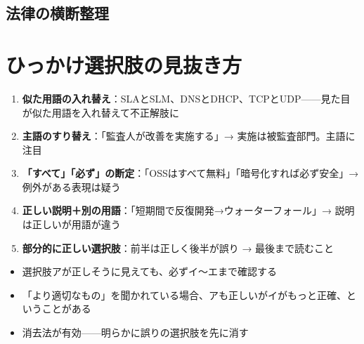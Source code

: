 \subsection{法律の横断整理}

\begin{hikaku}[法律の出題マップ]
\end{hikaku}

\section{ひっかけ選択肢の見抜き方}

\begin{teigi}[ひっかけパターン5選]
\begin{enumerate}
  \item \textbf{似た用語の入れ替え}：SLAとSLM、DNSとDHCP、TCPとUDP——見た目が似た用語を入れ替えて不正解肢に
  \item \textbf{主語のすり替え}：「監査人が改善を実施する」→ 実施は被監査部門。主語に注目
  \item \textbf{「すべて」「必ず」の断定}：「OSSはすべて無料」「暗号化すれば必ず安全」→ 例外がある表現は疑う
  \item \textbf{正しい説明＋別の用語}：「短期間で反復開発→ウォーターフォール」→ 説明は正しいが用語が違う
  \item \textbf{部分的に正しい選択肢}：前半は正しく後半が誤り → 最後まで読むこと
\end{enumerate}
\end{teigi}

\begin{pitfall}[最初の選択肢で安心しない]
\begin{itemize}
  \item 選択肢アが正しそうに見えても、必ずイ〜エまで確認する
  \item 「より適切なもの」を聞かれている場合、アも正しいがイがもっと正確、ということがある
  \item 消去法が有効——明らかに誤りの選択肢を先に消す
\end{itemize}
\end{pitfall}

